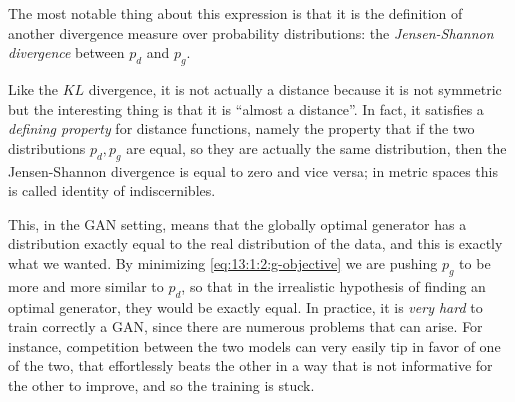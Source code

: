 The most notable thing about this expression is that it is the definition of another divergence measure over probability distributions: the \emph{Jensen-Shannon divergence} between $p_d$ and $p_g$. 

Like the $KL$ divergence, it is not actually a distance because it is not symmetric but the interesting thing is that it is ``almost a distance''. In fact, it satisfies a \emph{defining property} for distance functions, namely the property that if the two distributions $p_d, p_g$ are equal, so they are actually the same distribution, then the Jensen-Shannon divergence is equal to zero and vice versa; in metric spaces this is called identity of indiscernibles. 

This, in the GAN setting, means that the globally optimal generator has a distribution exactly equal to the real distribution of the data, and this is exactly what we wanted. By minimizing \cref{eq:13:1:2:g-objective} we are pushing $p_g$ to be more and more similar to $p_d$, so that in the irrealistic hypothesis of finding an optimal generator, they would be exactly equal. In practice, it is \emph{very hard} to train correctly a GAN, since there are numerous problems that can arise. For instance, competition between the two models can very easily tip in favor of one of the two, that effortlessly beats the other in a way that is not informative for the other to improve, and so the training is stuck.

